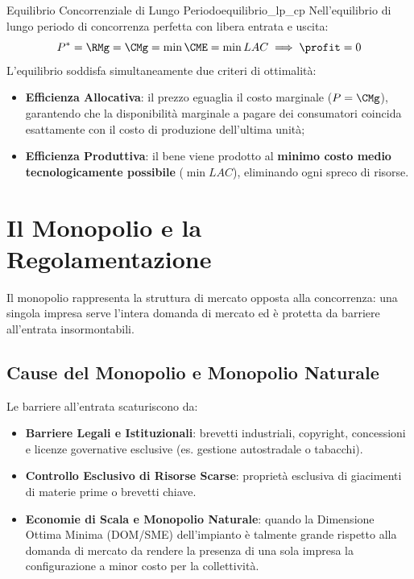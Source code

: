 \begin{legge}{Equilibrio Concorrenziale di Lungo Periodo}{equilibrio_lp_cp}
Nell'equilibrio di lungo periodo di concorrenza perfetta con libera entrata e uscita:
\begin{equation}
    P^* = \RMg = \CMg = \min \CME = \min LAC \implies \profit = 0
\end{equation}
L'equilibrio soddisfa simultaneamente due criteri di ottimalità:
\begin{itemize}
    \item \textbf{Efficienza Allocativa}: il prezzo eguaglia il costo marginale ($P = \CMg$), garantendo che la disponibilità marginale a pagare dei consumatori coincida esattamente con il costo di produzione dell'ultima unità;
    \item \textbf{Efficienza Produttiva}: il bene viene prodotto al \textbf{minimo costo medio tecnologicamente possibile} ($\min LAC$), eliminando ogni spreco di risorse.
\end{itemize}
\end{legge}

\section{Il Monopolio e la Regolamentazione}

Il monopolio rappresenta la struttura di mercato opposta alla concorrenza: una singola impresa serve l'intera domanda di mercato ed è protetta da barriere all'entrata insormontabili.

\subsection{Cause del Monopolio e Monopolio Naturale}
Le barriere all'entrata scaturiscono da:
\begin{itemize}
    \item \textbf{Barriere Legali e Istituzionali}: brevetti industriali, copyright, concessioni e licenze governative esclusive (es. gestione autostradale o tabacchi).
    \item \textbf{Controllo Esclusivo di Risorse Scarse}: proprietà esclusiva di giacimenti di materie prime o brevetti chiave.
    \item \textbf{Economie di Scala e Monopolio Naturale}: quando la Dimensione Ottima Minima (DOM/SME) dell'impianto è talmente grande rispetto alla domanda di mercato da rendere la presenza di una sola impresa la configurazione a minor costo per la collettività.
\end{itemize}

